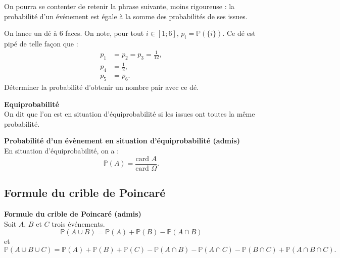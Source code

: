 \documentclass[../PolyS4.tex]{subfiles}
\begin{document}
\begin{Rmq} 
On pourra se contenter de retenir la phrase suivante, moins rigoureuse : la probabilité d'un événement est égale à la somme des probabilités de ses issues.\\


\end{Rmq} 


On lance un dé à 6 faces. On note, pour tout $i \in [1 ; 6]$, $p_i = \mathbb{P}(\{i\})$. Ce dé est pipé de telle façon que :
\begin{align*}
    p_1 &= p_2 = p_3 = \frac{1}{12}, \\
    p_4 &= \frac{1}{2}, \\
    p_5 &= p_6.
\end{align*}
Déterminer la probabilité d'obtenir un nombre pair avec ce dé.

\begin{Def}\textbf{Equiprobabilité } \\

On dit que l'on est en situation d'équiprobabilité si les issues ont toutes la même probabilité.\\

\end{Def}

\begin{Prop}\textbf{Probabilité d'un évènement en situation d'équiprobabilité (admis)} \\

En situation d'équiprobabilité, on a :
\[
\mathbb{P}(A) = \frac{\text{card } A}{\text{card } \Omega}.
\]

\end{Prop}

\newpage

\subsection{Formule du crible de Poincaré}
\bigskip

\begin{Prop}\textbf{Formule du crible de Poincaré (admis)} \\
Soit $A$, $B$ et $C$ trois événements.
\[
\mathbb{P}(A \cup B) = \mathbb{P}(A) + \mathbb{P}(B) - \mathbb{P}(A \cap B)
\]
et
\[
\mathbb{P}(A \cup B \cup C) = \mathbb{P}(A) + \mathbb{P}(B) + \mathbb{P}(C) - \mathbb{P}(A \cap B) - \mathbb{P}(A \cap C) - \mathbb{P}(B \cap C) + \mathbb{P}(A \cap B \cap C).
\]

\end{Prop}
\end{document}
